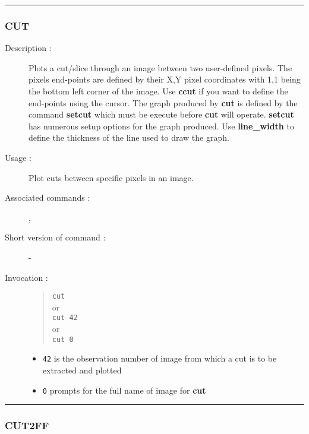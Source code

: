 \hrule 
\subsubsection*{\label{CUT}CUT}

\begin{description}

\item[Description :] Plots a cut/slice through an image between two
user-defined pixels.  The pixels end-points are defined by their X,Y
pixel coordinates with 1,1 being the bottom left corner of the image.
Use {\bf ccut} if you want to define the end-points using the cursor.
The graph produced by {\bf cut} is defined by the command {\bf setcut}
which must be execute before {\bf cut} will operate.  {\bf setcut} has
numerous setup options for the graph produced.  Use {\bf line\_width}
to define the thickness of the line used to draw the graph.

\item[Usage :] Plot cuts between specific pixels in an image.
\item[Associated commands :] {\tt {}}, 
{\tt {}}
\item[Short version of command :] - 
\item[Invocation :]

\begin{quote}{\tt  cut }\\
or \\
{\tt cut 42 }\\
or \\
{\tt cut 0 }
\end{quote}

\begin{itemize}
\item {\tt 42} is the observation number of image from which a cut is to
be extracted and plotted
\item {\tt 0} prompts for the full name of image for {\bf cut}
\end{itemize}

\end{description}

\hrule 
\subsubsection*{\label{CUT2FF}CUT2FF}


